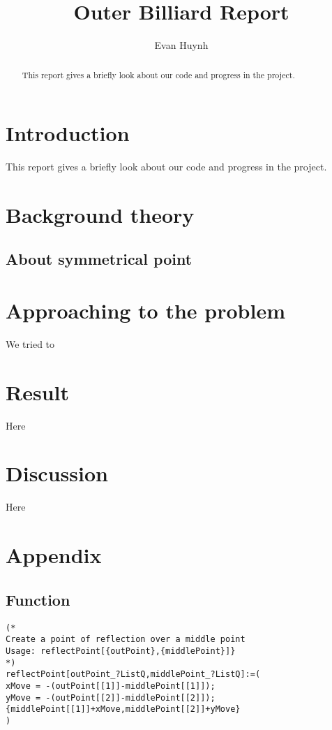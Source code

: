 \documentclass[11pt, a4paper]{article}
\begin{document}
\title{Outer Billiard Report}
\author{Evan Huynh}
\maketitle



\begin{abstract}
	This report gives a briefly look about our code and progress in the  project.
\end{abstract}

\tableofcontents

\section{Introduction}
This report gives a briefly look about our code and progress in the  project. 

\section{Background theory}
\subsection{About symmetrical point}

\section{Approaching to the problem}
We tried to 

\section{Result}
Here  

\section{Discussion}
Here

\pagebreak
\section{Appendix}
\subsection{Function}
\begin{lstlisting}
(*
Create a point of reflection over a middle point
Usage: reflectPoint[{outPoint},{middlePoint}]}
*)
reflectPoint[outPoint_?ListQ,middlePoint_?ListQ]:=(
xMove = -(outPoint[[1]]-middlePoint[[1]]);
yMove = -(outPoint[[2]]-middlePoint[[2]]);
{middlePoint[[1]]+xMove,middlePoint[[2]]+yMove}
)
\end{lstlisting} 
\end{document}
